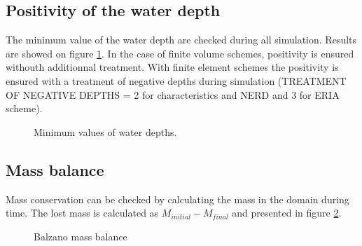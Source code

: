 


\subsection{Positivity of the water depth}

The minimum value of the water depth are checked during all simulation.
Results are showed on figure \ref{t2d:balzano:minmax}.
In the case of finite volume schemes, positivity is ensured withouth additionnal treatment.
With finite element schemes the positivity is ensured with a treatment of negative depths
during simulation (TREATMENT OF NEGATIVE DEPTHS = 2 for characteristics and NERD and 3 for ERIA scheme).

\begin{figure}[H]
\centering
{}
\caption{Minimum values of water depths.}
\label{t2d:balzano:minmax}
\end{figure}

\subsection{Mass balance}

Mass conservation can be checked by calculating the mass in the domain during time. The lost mass is calculated as
$M_{initial} - M_{final}$ and presented in figure \ref{fig:balzano:massbalance}.

\begin{figure}[h!]
  \centering
  \caption{Balzano mass balance}\label{fig:balzano:massbalance}
\end{figure}

